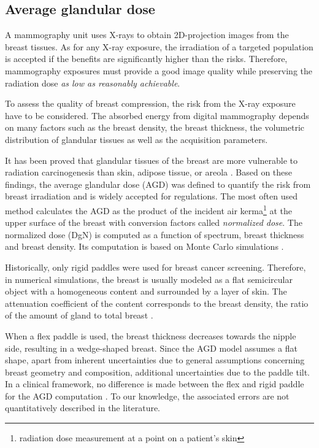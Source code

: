 \subsection{Average glandular dose}
A mammography unit uses X-rays to obtain 2D-projection images from the breast tissues. As for any X-ray exposure, the irradiation of a targeted population is accepted if the benefits are significantly higher than the risks. Therefore,  mammography exposures must provide a good image quality while preserving the radiation dose \textit{as low as reasonably achievable}.

To assess the quality of breast compression, the risk from the X-ray exposure have to be considered.  The absorbed energy from digital mammography depends on many factors such as the breast density, the breast thickness, the volumetric distribution of glandular tissues as well as the acquisition parameters. 

It has been proved that glandular tissues of the breast are more vulnerable to radiation carcinogenesis than skin, adipose tissue, or areola \citep{richard_absorbed_1979}. Based on these findings, the average glandular dose (AGD) was defined to quantify the risk from breast irradiation and is widely accepted for regulations.  The most often used method calculates the AGD as the product of the incident air kerma\footnote{radiation dose measurement at a point on a patient's skin} at the upper surface of the breast with conversion factors called \textit{normalized dose}. The normalized dose (DgN)  is computed as a function of spectrum, breast thickness and breast density.  Its computation is based on Monte Carlo simulations \citep{dance_additional_2000,boone_glandular_1999}. 

Historically, only rigid paddles were used for breast cancer screening. Therefore, in numerical simulations, the breast is usually modeled as a flat semicircular object with a homogeneous content and surrounded by a layer of skin. The attenuation coefficient of the content corresponds to the breast density, the ratio of the amount of gland to total breast \citep{dance_additional_2000}.

 When a flex paddle is used, the breast thickness decreases towards the nipple side, resulting in a wedge-shaped breast.  Since the AGD model assumes a flat shape, apart from inherent uncertainties due to general assumptions concerning breast geometry and composition, additional uncertainties due to the paddle tilt. In a clinical framework, no difference is made between the flex and rigid paddle for the AGD computation \citep{broeders_comparison_2015}. To our knowledge, the associated errors are not quantitatively described in the literature.  

